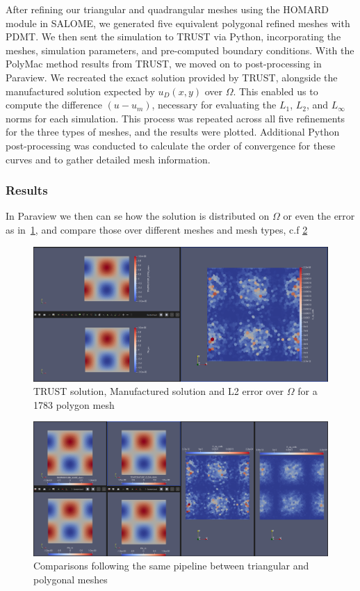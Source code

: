 \documentclass{article}
\begin{document}
After refining our triangular and quadrangular meshes using the HOMARD module in SALOME, we generated five equivalent polygonal refined meshes with PDMT. We then sent the simulation to TRUST via Python, incorporating the meshes, simulation parameters, and pre-computed boundary conditions. With the PolyMac method results from TRUST, we moved on to post-processing in Paraview. We recreated the exact solution provided by TRUST, alongside the manufactured solution expected by $u_D(x,y)$ over $\Omega$. This enabled us to compute the difference $(u - u_m)$, necessary for evaluating the $L_1$, $L_2$, and $L_\infty$ norms for each simulation. This process was repeated across all five refinements for the three types of meshes, and the results were plotted. Additional Python post-processing was conducted to calculate the order of convergence for these curves and to gather detailed mesh information.

\subsubsection{Results}
In Paraview we then can se how the solution is distributed on $\Omega$ or even the error as in~\cref{polyPipeline}, and compare those over different meshes and mesh types, c.f \cref{comTRI_POLY}
\begin{figure}[htbp]
	\centering
	\includegraphics[width=1.0\textwidth]{./Images/polyPipeline.png}
	\caption{\label{polyPipeline} TRUST solution, Manufactured solution and L2 error over $\Omega$ for a 1783 polygon mesh}
\end{figure}
\begin{figure}[htbp]
	\centering
	\includegraphics[width=1.0\textwidth]{./Images/comTRI_POLY.png}
	\caption{\label{comTRI_POLY} Comparisons following the same pipeline between triangular and polygonal meshes}
\end{figure}
\end{document}
